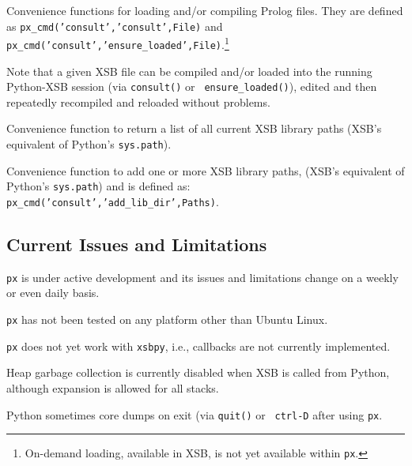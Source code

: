 \begin{description}
%
  Convenience functions for loading and/or compiling Prolog files.
  They are defined as {\tt px\_cmd('consult','consult',File)} and {\tt
    px\_cmd('consult','ensure\_loaded',File)}.\footnote{On-demand
    loading, available in XSB, is not yet available within {\tt px}.}

  Note that a given XSB file can be compiled and/or loaded into the
  running Python-XSB session (via {\tt consult()} or {\tt
    ensure\_loaded()}), edited and then repeatedly recompiled and
    reloaded without problems.

%  
  Convenience function to return a list of all current XSB library
  paths (XSB's equivalent of Python's {\tt sys.path}).

%  
    Convenience function to add one or more XSB library paths, (XSB's
    equivalent of Python's {\tt sys.path}) and is defined as: {\tt
      px\_cmd('consult','add\_lib\_dir',Paths)}.
  
\end{description}

\subsection{Current Issues and Limitations} \label{sec:px-limits}

{\tt px} is under active development and its issues and limitations
change on a weekly or even daily basis.

\bi
\item {\tt px} has not been tested on any platform other than Ubuntu
  Linux.
\item {\tt px} does not yet work with {\tt xsbpy}, i.e., callbacks are
  not currently implemented.
\item Heap garbage collection is currently disabled when XSB is called
  from Python, although expansion is allowed for all stacks. 
\item Python sometimes core dumps on exit (via {\tt quit()} or {\tt
  ctrl-D} after using {\tt px}.
  
\ei  
